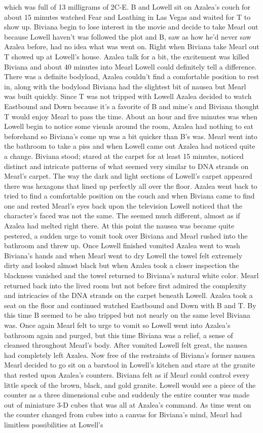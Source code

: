 \documentclass[12pt]{book}
\begin{document}
which was full of 13 milligrams of 2C-E. B and Lowell sit on Azalea's couch for about 15 minutes watched Fear and Loathing in Las Vegas and waited for T to show up. Biviana begin to lose interest in the movie and decide to take Mearl out because Lowell haven't was followed the plot and B, saw as how he'd never saw Azalea before, had no idea what was went on. Right when Biviana take Mearl out T showed up at Lowell's house. Azalea talk for a bit, the excitement was killed Biviana and about 40 minutes into Mearl Lowell could definitely tell a difference. There was a definite bodyload, Azalea couldn't find a comfortable position to rest in, along with the bodyload Biviana had the slightest bit of nausea but Mearl was built quickly. Since T was not tripped with Lowell Azalea decided to watch Eastbound and Down because it's a favorite of B and mine's and Biviana thought T would enjoy Mearl to pass the time. About an hour and five minutes was when Lowell begin to notice some visuals around the room, Azalea had nothing to eat beforehand so Biviana's come up was a bit quicker than B's was. Mearl went into the bathroom to take a piss and when Lowell came out Azalea had noticed quite a change. Biviana stood; stared at the carpet for at least 15 minutes, noticed distinct and intricate patterns of what seemed very similar to DNA strands on Mearl's carpet. The way the dark and light sections of Lowell's carpet appeared there was hexagons that lined up perfectly all over the floor. Azalea went back to tried to find a comfortable position on the couch and when Biviana came to find one and rested Mearl's eyes back upon the television Lowell noticed that the character's faced was not the same. The seemed much different, almost as if Azalea had melted right there. At this point the nausea was became quite pestered, a sudden urge to vomit took over Biviana and Mearl rushed into the bathroom and threw up. Once Lowell finished vomited Azalea went to wash Biviana's hands and when Mearl went to dry Lowell the towel felt extremely dirty and looked almost black but when Azalea took a closer inspection the blackness vanished and the towel returned to Biviana's natural white color. Mearl returned back into the lived room but not before first admired the complexity and intricacies of the DNA strands on the carpet beneath Lowell. Azalea took a seat on the floor and continued watched Eastbound and Down with B and T. By this time B seemed to be also tripped but not nearly on the same level Biviana was. Once again Mearl felt to urge to vomit so Lowell went into Azalea's bathroom again and purged, but this time Biviana was a relief, a sense of cleansed throughout Mearl's body. After vomited Lowell felt great, the nausea had completely left Azalea. Now free of the restraints of Biviana's former nausea Mearl decided to go sit on a barstool in Lowell's kitchen and stare at the granite that rested upon Azalea's counters. Biviana felt as if Mearl could control every little speck of the brown, black, and gold granite. Lowell would see a piece of the counter as a three dimensional cube and suddenly the entire counter was made out of miniature 3-D cubes that was all at Azalea's command. As time went on the counter changed from cubes into a canvas for Biviana's mind, Mearl had limitless possibilities at Lowell's 
\end{document}
